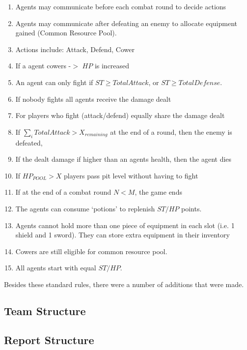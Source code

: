 \begin{enumerate}
    \item Agents may communicate before each combat round to decide actions
    \item Agents may communicate after defeating an enemy to allocate equipment gained (Common Resource Pool). 
    \item Actions include: Attack, Defend, Cower
    \item If a agent cowers -$>$ $HP$ is increased
    \item An agent can only fight if $ST \geq TotalAttack$, or $ST \geq TotalDefense$.
    \item If nobody fights all agents receive the damage dealt
    \item For players who fight (attack/defend) equally share the damage dealt
    \item If $\sum_{i} TotalAttack > X_{remaining}$ at the end of a round, then the enemy is defeated, 
    \item If the dealt damage if higher than an agents health, then the agent dies
    \item If $HP_{POOL} > X$ players pass pit level without having to fight
    \item If at the end of a combat round $N<M$, the game ends 
    \item The agents can consume `potions' to replenish $ST/HP$ points.
    \item Agents cannot hold more than one piece of equipment in each slot (i.e. 1 shield and 1 sword). They can store extra equipment in their inventory
    \item Cowers are still eligible for common resource pool.  
    \item All agents start with equal $ST/HP$. 
\end{enumerate}


Besides these standard rules, there were a number of additions that were made. 


\subsection{Team Structure}\label{sec:team struct}


\subsection{Report Structure}\label{sec:report struct}

% 
